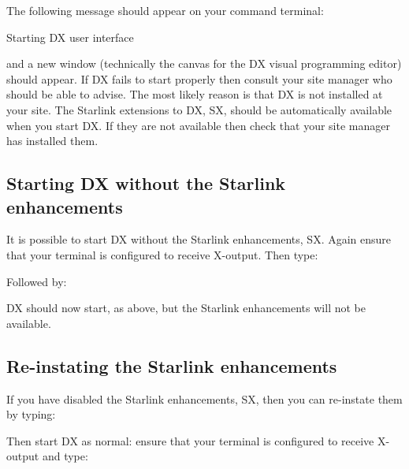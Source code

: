 \documentclass[twoside,11pt]{starlink}
\begin{document}
\begin{terminalv}
\end{terminalv}

The following message should appear on your command terminal:

\begin{terminalv}
Starting DX user interface
\end{terminalv}

and a new window (technically the canvas for the DX visual programming
editor) should appear. If DX fails to start properly then consult your
site manager who should be able to advise. The most likely reason is
that DX is not installed at your site. The Starlink extensions to DX,
SX, should be automatically available when you start DX.  If they
are not available then check that your site manager has installed them.

\newpage
\subsection{Starting DX without the Starlink enhancements}

It is possible to start DX without the Starlink enhancements, SX. Again
ensure that your terminal is configured to receive X-output. Then
type:

\begin{terminalv}
\end{terminalv}

Followed by:

\begin{terminalv}
\end{terminalv}

DX should now start, as above, but the Starlink enhancements will not
be available.

\subsection{Re-instating the Starlink enhancements}

If you have disabled the Starlink enhancements, SX, then you can
re-instate them by typing:

\begin{terminalv}
\end{terminalv}

Then start DX as normal: ensure that your terminal is configured to
receive X-output and type:

\begin{terminalv}
\end{terminalv}
\end{document}
